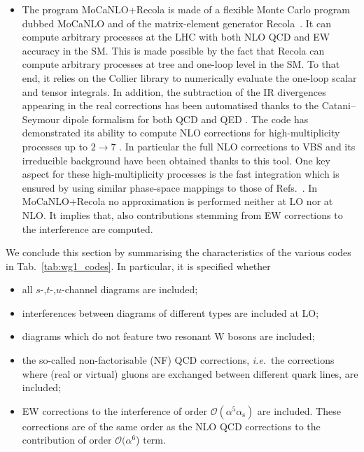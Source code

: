\documentclass[twocolumn,epjc3]{svjour3} %
\newcommand{\alphas}{\ensuremath{\alpha_\text{s}}\xspace}
\begin{document}
\begin{itemize}
    \item The program {\sc MoCaNLO+Recola} is made of a flexible Monte Carlo program dubbed {\sc MoCaNLO} and of the matrix-element generator {\sc Recola}~\cite{Actis:2012qn,Actis:2016mpe}.
    It can compute arbitrary processes at the LHC with both NLO QCD and EW accuracy in the SM.
    This is made possible by the fact that {\sc Recola} can compute arbitrary processes at tree and one-loop level in the SM.
    To that end, it relies on the {\sc Collier} library \cite{Denner:2014gla,Denner:2016kdg} to numerically evaluate the one-loop scalar and tensor integrals.
    In addition, the subtraction of the IR divergences appearing in the real corrections has been automatised thanks to the Catani--Seymour dipole formalism for both QCD and QED \cite{Catani:1996vz,Dittmaier:1999mb}.
    The code has demonstrated its ability to compute NLO corrections for high-multiplicity processes up to $2 \to 7$ \cite{Denner:2015yca,Denner:2016wet}.
    In particular the full NLO corrections to VBS and its irreducible background \cite{Biedermann:2016yds,Biedermann:2017bss} have been obtained thanks to this tool.
    One key aspect for these high-multiplicity processes is the fast integration which is ensured by using similar phase-space mappings to those of Refs.~\cite{Berends:1994pv,Denner:1999gp,Dittmaier:2002ap}. 
    In {\sc MoCaNLO+Recola} no approximation is performed neither at LO nor at NLO.
    It implies that, also contributions stemming from EW corrections to the interference are computed.
            
    \end{itemize}

    We conclude this section by summarising the characteristics of the various codes in Tab.~\ref{tab:wg1_codes}.
    In particular, it is specified whether
    \begin{itemize}
        \item all $s$-,$t$-,$u$-channel diagrams are included;
        \item interferences between diagrams of different types are included at LO;
        \item diagrams which do not feature two resonant W bosons are included;
        \item the so-called non-factoris\-able (NF) QCD corrections, \emph{i.e.}\ the corrections where (real or virtual) gluons are exchanged between different quark lines,
            are included;
        \item EW corrections to the interference of order $\mathcal O (\alpha^5\alphas)$ are included.
        These corrections are of the same order as the NLO QCD corrections to the contribution of order $\mathcal O (\alpha^6$) term.
    \end{itemize}
\end{document}
